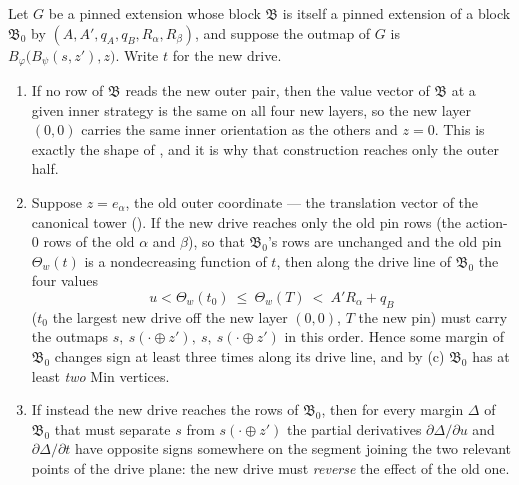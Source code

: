 \begin{proposition}\label{rs:where}
Let $G$ be a pinned extension whose block $\mathfrak B$ is itself a pinned
extension of a block $\mathfrak B_0$ by $(A,A',q_A,q_B,R_\alpha,R_\beta)$, and
suppose the outmap of $G$ is $B_\varphi\bigl(B_\psi(s,z'),z\bigr)$. Write $t$
for the new drive.
\begin{enumerate}[label=(\roman*),leftmargin=2.2em]
\item If no row of $\mathfrak B$ reads the new outer pair, then the value
      vector of $\mathfrak B$ at a given inner strategy is the same on all
      four new layers, so the new layer $(0,0)$ carries the same inner
      orientation as the others and $z=0$. This is exactly the shape of
      , and it is why that construction reaches only the
      outer half.
\item Suppose $z=e_\alpha$, the old outer coordinate --- the translation
      vector of the canonical tower (). If the new
      drive reaches only the old pin rows (the action-$0$ rows of the old
      $\alpha$ and $\beta$), so that $\mathfrak B_0$'s rows are unchanged and
      the old pin $\Theta_w(t)$ is a nondecreasing function of $t$, then
      along the drive line of $\mathfrak B_0$ the four values
      \[
        u<\Theta_w(t_0)\ \le\ \Theta_w(T)\ <\ A'R_\alpha+q_B
      \]
      ($t_0$ the largest new drive off the new layer $(0,0)$, $T$ the new pin)
      must carry the outmaps $s,\ s(\cdot\oplus z'),\ s,\ s(\cdot\oplus z')$ in
      this order. Hence some margin of $\mathfrak B_0$ changes sign at least
      three times along its drive line, and by (c)
      $\mathfrak B_0$ has at least \emph{two} Min vertices.
\item If instead the new drive reaches the rows of $\mathfrak B_0$, then for
      every margin $\Delta$ of $\mathfrak B_0$ that must separate $s$ from
      $s(\cdot\oplus z')$ the partial derivatives $\partial\Delta/\partial u$
      and $\partial\Delta/\partial t$ have opposite signs somewhere on the
      segment joining the two relevant points of the drive plane: the new
      drive must \emph{reverse} the effect of the old one.
\end{enumerate}
\end{proposition}

